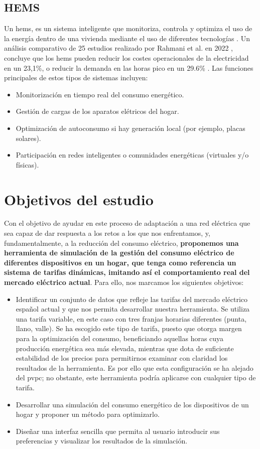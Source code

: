 \documentclass[11pt,a4paper]{book}
\begin{document}
\subsection{HEMS}
Un \gls{hems}, es un sistema inteligente que monitoriza, controla y optimiza el uso de la energía dentro de una vivienda mediante el uso de diferentes tecnologías \cite{demandresponse2025}. Un análisis comparativo de 25 estudios realizado por Rahmani et al. en 2022 \cite{rahmani2022}, concluye que los \gls{hems} pueden reducir los costes operacionales de la electricidad en un 23,1\%, o reducir la demanda en las horas pico en un 29.6\% . Las funciones principales de estos tipos de sistemas incluyen:
\begin{itemize}
    \item Monitorización en tiempo real del consumo energético.
    \item Gestión de cargas de los aparatos elétricos del hogar.
    \item Optimización de autoconsumo si hay generación local (por ejemplo, placas solares).
    \item Participación en redes inteligentes o comunidades energéticas (virtuales y/o físicas).
\end{itemize}

\section{Objetivos del estudio}
Con el objetivo de ayudar en este proceso de adaptación a una red eléctrica que sea capaz de dar respuesta a los retos a los que nos enfrentamos, y, fundamentalmente, a la reducción del consumo eléctrico, \textbf{proponemos una herramienta de simulación de la gestión del consumo eléctrico de \mbox{diferentes} \mbox{dispositivos} en un hogar, que tenga como referencia un sistema de tarifas dinámicas, imitando así el comportamiento real del mercado eléctrico actual}. Para ello, nos marcamos los siguientes objetivos: 

\begin{itemize}
  \item Identificar un conjunto de datos que refleje las tarifas del mercado eléctrico español actual y que nos permita desarrollar nuestra herramienta. Se utiliza una tarifa variable, en este caso con tres franjas horarias diferentes (punta, llano, valle). Se ha escogido este tipo de tarifa, puesto que otorga margen para la optimización del consumo, beneficiando aquellas horas cuya producción energética sea más elevada, mientras que dota de suficiente estabilidad de los precios para permitirnos examinar con claridad los resultados de la herramienta. Es por ello que esta configuración se ha alejado del \gls{pvpc}; no obstante, este herramienta podría aplicarse con cualquier tipo de tarifa.
  \item Desarrollar una simulación del consumo energético de los dispositivos de un hogar y proponer un método para optimizarlo. 
  \item Diseñar una interfaz sencilla que permita al usuario introducir sus preferencias y visualizar los resultados de la simulación.
\end{itemize}
\end{document}
